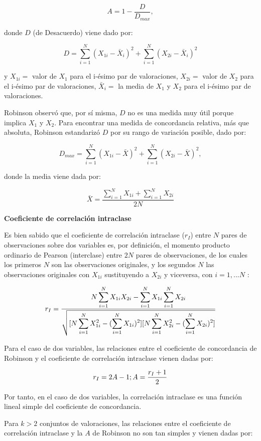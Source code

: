 \documentclass[12pt,a4paper,]{book}
\numberwithin{dummy}{section}
\theoremstyle{ocrenumbox}
\theoremstyle{blacknumex}
\theoremstyle{blacknumbox}
\theoremstyle{ocrenum}
\theoremstyle{ocrenum}
\begin{document}
\[
A=1-\frac{D}{D_{max}},
\]

donde \(D\) (de Desacuerdo) viene dado por:

\[
D=\sum_{i=1}^N (X_{1i}-\bar X_i)^2 + \sum_{i=1}^N (X_{2i}-\bar X_i)^2
\]

y \(X_{1i}=\) valor de \(X_1\) para el i-ésimo par de valoraciones,
\(X_{2i}=\) valor de \(X_2\) para el i-ésimo par de valoraciones,
\(\bar X_{i}=\) la media de \(X_1\) y \(X_2\) para el i-ésimo par de
valoraciones.

Robinson observó que, por sí misma, \(D\) no es una medida muy útil
porque implica \(X_1\) y \(X_2\). Para encontrar una medida de
concordancia relativa, más que absoluta, Robinson estandarizó \(D\) por
su rango de variación posible, dado por:

\[
D_{max}=\sum_{i=1}^N (X_{1i}-\bar X)^2 + \sum_{i=1}^N (X_{2i}-\bar X)^2,
\]

donde la media viene dada por:

\[
\bar X = \frac {\displaystyle\sum_{i=1}^N X_{1i}+\displaystyle\sum_{i=1}^N X_{2i}}{2N}
\]

\textbf{Coeficiente de correlación intraclase}

Es bien sabido que el coeficiente de correlación intraclase (\(r_I\))
entre \(N\) pares de observaciones sobre dos variables es, por
definición, el momento producto ordinario de Pearson (interclase) entre
\(2N\) pares de observaciones, de los cuales los primeros \(N\) son las
observaciones originales, y los segundos \(N\) las observaciones
originales con \(X_{1i}\) sustituyendo a \(X_{2i}\) y viceversa, con
\(i = 1, . . . N\) \citep{Fisher1934}:

\[
r_I=\frac{N\displaystyle\sum_{i=1}^N X_{1i}X_{2i}-\displaystyle\displaystyle\sum_{i=1}^N X_{1i}\sum_{i=1}^N X_{2i}}{\displaystyle\sqrt{[N\displaystyle\sum_{i=1}^N X^2_{1i}-(\displaystyle\sum_{i=1}^N X_{1i})^2][N\displaystyle\sum_{i=1}^N X^2_{2i}-(\displaystyle\sum_{i=1}^N X_{2i})^2]}}
\]

Para el caso de dos variables, las relaciones entre el coeficiente de
concordancia de Robinson y el coeficiente de correlación intraclase
vienen dadas por:

\[
r_I=2A-1; \\A=\frac{r_I+1}{2}
\]

Por tanto, en el caso de dos variables, la correlación intraclase es una
función lineal simple del coeficiente de concordancia.

Para \(k > 2\) conjuntos de valoraciones, las relaciones entre el
coeficiente de correlación intraclase y la \(A\) de Robinson no son tan
simples y vienen dadas por:
\end{document}
